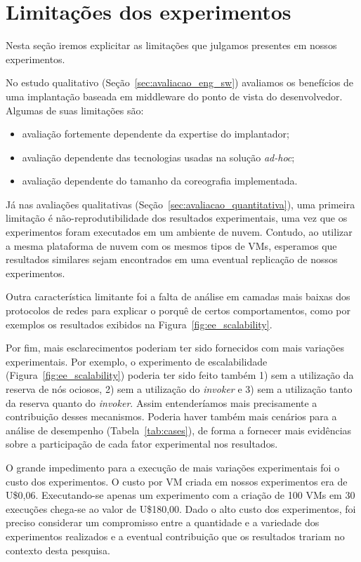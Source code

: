 \section{Limitações dos experimentos}

Nesta seção iremos explicitar as limitações que julgamos presentes em nossos experimentos.

No estudo qualitativo (Seção~\ref{sec:avaliacao_eng_sw})
avaliamos os benefícios de uma implantação baseada em middleware
do ponto de vista do desenvolvedor. Algumas de suas limitações são:

\begin{itemize}
\item avaliação fortemente dependente da expertise do implantador;
\item avaliação dependente das tecnologias usadas na solução \emph{ad-hoc};
\item avaliação dependente do tamanho da coreografia implementada.
\end{itemize}

Já nas avaliações qualitativas (Seção~\ref{sec:avaliacao_quantitativa}),
uma primeira limitação é não-reprodutibilidade dos resultados experimentais,
uma vez que os experimentos foram executados em um ambiente de nuvem.
Contudo, ao utilizar a mesma plataforma de nuvem com os mesmos tipos de VMs,
esperamos que resultados similares sejam encontrados em uma eventual replicação
de nossos experimentos.

Outra característica limitante foi a falta de análise em camadas mais baixas 
dos protocolos de redes para explicar o porquê de certos comportamentos,
como por exemplos os resultados exibidos na Figura~\ref{fig:ee_scalability}.

Por fim, mais esclarecimentos poderiam ter sido fornecidos com mais variações
experimentais. Por exemplo, o experimento de escalabilidade
(Figura~\ref{fig:ee_scalability}) poderia ter sido feito também
1) sem a utilização da reserva de nós ociosos, 2) sem a utilização do \emph{invoker} e
3) sem a utilização tanto da reserva quanto do \emph{invoker}. 
Assim entenderíamos mais precisamente a contribuição desses mecanismos.
Poderia haver também mais cenários para a análise de desempenho (Tabela~\ref{tab:cases}),
de forma a fornecer mais evidências sobre a participação de cada fator experimental
nos resultados.

O grande impedimento para a execução de mais variações experimentais foi o custo
dos experimentos. O custo por VM criada em nossos experimentos era de U\$0,06.
Executando-se apenas um experimento com a criação de 100 VMs em 30 execuções
chega-se ao valor de U\$180,00. Dado o alto custo dos experimentos, foi preciso
considerar um compromisso entre a quantidade e a variedade dos experimentos realizados
e a eventual contribuição que os resultados trariam no contexto desta pesquisa.


